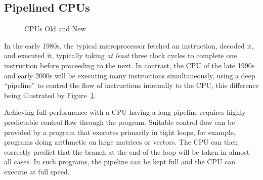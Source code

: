 \subsection{Pipelined CPUs}
\label{sec:cpu:Pipelined CPUs}

\begin{figure}[htb]
\begin{center}
\end{center}
\caption{CPUs Old and New}
\label{fig:cpu:CPUs Old and New}
\end{figure}

In the early 1980s, the typical microprocessor fetched an instruction,
decoded it, and executed it, typically taking \emph{at least} three
clock cycles to complete one instruction before proceeding to the next.
In contrast, the CPU of the late 1990s and early 2000s will be executing
many instructions simultaneously, using a deep ``pipeline'' to control
the flow of instructions internally to the CPU, this difference being
illustrated by Figure~\ref{fig:cpu:CPUs Old and New}.

Achieving full performance with a CPU having a long pipeline requires
highly predictable control flow through the program.
Suitable control flow can be provided by a program that executes primarily
in tight loops, for example, programs doing arithmetic on large matrices
or vectors.
The CPU can then correctly predict that the branch at the end of the loop
will be taken in almost all cases.
In such programs, the pipeline can be kept full and the CPU can execute
at full speed.

